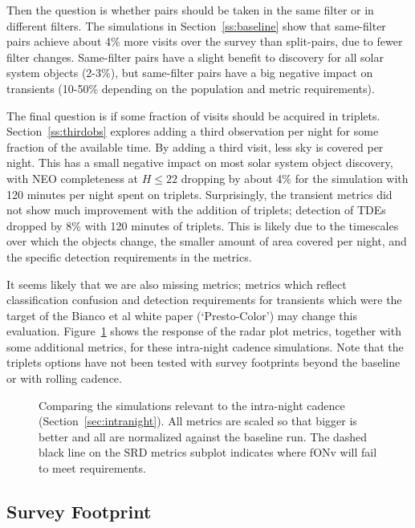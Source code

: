 Then the question is whether pairs should be taken in the same filter or in different filters. The simulations in Section~\ref{ss:baseline} show that same-filter pairs achieve about 4\% more visits over the survey than split-pairs, due to fewer filter changes. Same-filter pairs have a slight benefit to discovery for all solar system objects (2-3\%), but same-filter pairs have a big negative impact on transients (10-50\% depending on the population and metric requirements). 

The final question is if some fraction of visits should be acquired in triplets. Section~\ref{ss:thirdobs} explores adding a third observation per night for some fraction of the available time. By adding a third visit, less sky is covered per night. This has a small negative impact on most solar system object discovery, with NEO completeness at $H\le22$ dropping by about 4\% for the simulation with 120 minutes per night spent on triplets. Surprisingly, the transient metrics did not show much improvement with the addition of triplets; detection of TDEs dropped by 8\% with 120 minutes of triplets. This is likely due to the timescales over which the objects change, the smaller amount of area covered per night, and the specific detection requirements in the metrics.  

It seems likely that we are also missing metrics; metrics which reflect classification confusion and detection requirements for transients which were the target of the Bianco et al white paper (`Presto-Color') may change this evaluation. Figure~\ref{fig:intranight} shows the response of the radar plot metrics, together with some additional metrics, for these intra-night cadence simulations. Note that the triplets options have not been tested with survey footprints beyond the baseline or with rolling cadence. 

\begin{figure}
\caption{Comparing the simulations relevant to the intra-night cadence (Section~\ref{sec:intranight}). All metrics are scaled so that bigger is better and all are normalized against the baseline run. The dashed black line on the SRD metrics subplot indicates where fONv will fail to meet requirements.}
\label{fig:intranight}
\end{figure}


\subsection{Survey Footprint}\label{sec:bigfootprints}

